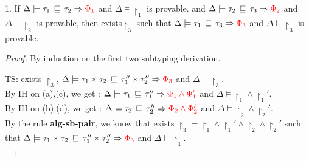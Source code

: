 \begin{lem}
1.  If $ \Delta \models \tau_1 \, \sqsubseteq \, \tau_2 \Rightarrow \textcolor{red} {\Phi_1}$ and $ \Delta  \models \restriction_1$ is provable. and $ \Delta \models \tau_2 \, \sqsubseteq \, \tau_3 \Rightarrow \textcolor{red} {\Phi_2}$ and $ \Delta  \models \restriction_2$ is provable, then exists$\restriction_3$ such that $ \Delta \models \tau_1 \, \sqsubseteq \, \tau_3 \Rightarrow \textcolor{red} {\Phi_3}$ and $ \Delta  \models \restriction_3$ is provable.
\end{lem}
\begin{proof}
By induction on the first two subtyping derivation.

  TS: exists $\restriction_3$, $ \Delta \models  \tau_1 \times \tau_2  \, \sqsubseteq \,  \tau_1'' \times \tau_2''
   \Rightarrow \textcolor{red} {\Phi_3 } $ and $ \Delta \models \restriction_3 $.\\
  By IH on (a),(c), we get : $ \Delta \models  \tau_1   \, \sqsubseteq \,  \tau_1'' 
   \Rightarrow \textcolor{red} {\Phi_1 \land \Phi_1' } $ and $ \Delta \models \restriction_1 \land \restriction_1'$.\\
  By IH on (b),(d), we get : $ \Delta \models  \tau_2   \, \sqsubseteq \,  \tau_2'' 
   \Rightarrow \textcolor{red} {\Phi_2 \land \Phi_2' } $ and $ \Delta \models \restriction_2 \land \restriction_2'$.\\
  By the rule \textbf{alg-sb-pair}, we know that exists $\restriction_3 = \restriction_1 \land \restriction_1' \land \restriction_2 \land \restriction_2'$ such that $ \Delta \models  \tau_1 \times \tau_2  \, \sqsubseteq \,  \tau_1'' \times \tau_2''
   \Rightarrow \textcolor{red} {\Phi_3 } $ and $ \Delta \models \restriction_3 $.\\
  

\end{proof}
